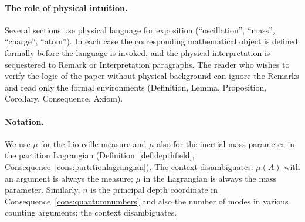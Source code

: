 \paragraph{The role of physical intuition.} Several sections use physical language for exposition (``oscillation'', ``mass'', ``charge'', ``atom''). In each case the corresponding mathematical object is defined formally before the language is invoked, and the physical interpretation is sequestered to Remark or Interpretation paragraphs. The reader who wishes to verify the logic of the paper without physical background can ignore the Remarks and read only the formal environments (Definition, Lemma, Proposition, Corollary, Consequence, Axiom).

\paragraph{Notation.} We use $\mu$ for the Liouville measure and $\mu$ also for the inertial mass parameter in the partition Lagrangian (Definition~\ref{def:depthfield}, Consequence~\ref{cons:partitionlagrangian}). The context disambiguates: $\mu(A)$ with an argument is always the measure; $\mu$ in the Lagrangian is always the mass parameter. Similarly, $n$ is the principal depth coordinate in Consequence~\ref{cons:quantumnumbers} and also the number of modes in various counting arguments; the context disambiguates.

\clearpage
